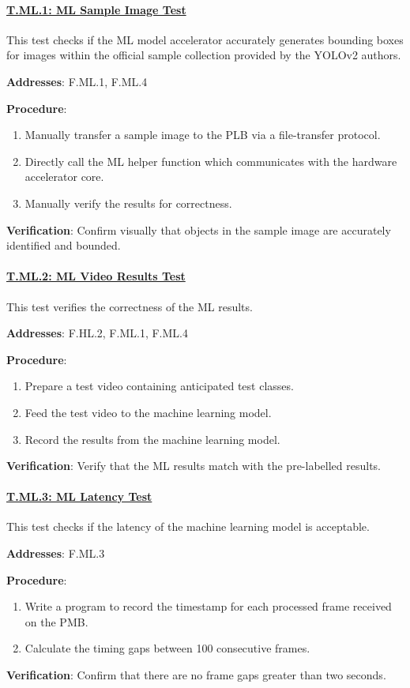\paragraph{\underline{T.ML.1: ML Sample Image Test}}

This test checks if the ML model accelerator accurately generates bounding boxes for images within the official sample collection provided by the YOLOv2 authors.

\textbf{Addresses}: F.ML.1, F.ML.4

\textbf{Procedure}:
\begin{enumerate}[noitemsep]
    \item Manually transfer a sample image to the PLB via a file-transfer protocol.
    \item Directly call the ML helper function which communicates with the hardware accelerator core.
    \item Manually verify the results for correctness.
\end{enumerate}

\textbf{Verification}: 
Confirm visually that objects in the sample image are accurately identified and bounded.

\paragraph{\underline{T.ML.2: ML Video Results Test}}

This test verifies the correctness of the ML results.

\textbf{Addresses}: F.HL.2, F.ML.1, F.ML.4

\textbf{Procedure}:
\begin{enumerate}[noitemsep]
    \item Prepare a test video containing anticipated test classes.
    \item Feed the test video to the machine learning model.
    \item Record the results from the machine learning model.
\end{enumerate}

\textbf{Verification}: 
Verify that the ML results match with the pre-labelled results.

%
\paragraph{\underline{T.ML.3: ML Latency Test}}

This test checks if the latency of the machine learning model is acceptable.

\textbf{Addresses}: F.ML.3

\textbf{Procedure}:
\begin{enumerate}[noitemsep]
    \item Write a program to record the timestamp for each processed frame received on the PMB.
    \item Calculate the timing gaps between 100 consecutive frames.
\end{enumerate}

\textbf{Verification}: 
Confirm that there are no frame gaps greater than two seconds.
